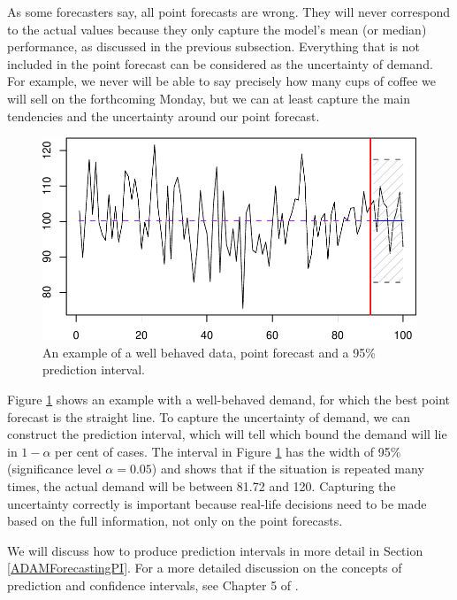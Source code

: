 \documentclass[
]{book}
\theoremstyle{definition}
\theoremstyle{definition}
\theoremstyle{definition}
\theoremstyle{definition}
\theoremstyle{remark}
\begin{document}
As some forecasters say, all point forecasts are wrong. They will never correspond to the actual values because they only capture the model's mean (or median) performance, as discussed in the previous subsection. Everything that is not included in the point forecast can be considered as the uncertainty of demand. For example, we never will be able to say precisely how many cups of coffee we will sell on the forthcoming Monday, but we can at least capture the main tendencies and the uncertainty around our point forecast.

\begin{figure}
\centering
\includegraphics{Svetunkov--2022----ADAM_files/figure-latex/adamExampleNormal-1.pdf}
\caption{\label{fig:adamExampleNormal}An example of a well behaved data, point forecast and a 95\% prediction interval.}
\end{figure}

Figure \ref{fig:adamExampleNormal} shows an example with a well-behaved demand, for which the best point forecast is the straight line. To capture the uncertainty of demand, we can construct the prediction interval, which will tell which bound the demand will lie in \(1-\alpha\) per cent of cases. The interval in Figure \ref{fig:adamExampleNormal} has the width of 95\% (significance level \(\alpha=0.05\)) and shows that if the situation is repeated many times, the actual demand will be between 81.72 and 120. Capturing the uncertainty correctly is important because real-life decisions need to be made based on the full information, not only on the point forecasts.

We will discuss how to produce prediction intervals in more detail in Section \ref{ADAMForecastingPI}. For a more detailed discussion on the concepts of prediction and confidence intervals, see Chapter 5 of \citet{SvetunkovSBA}.
\end{document}
